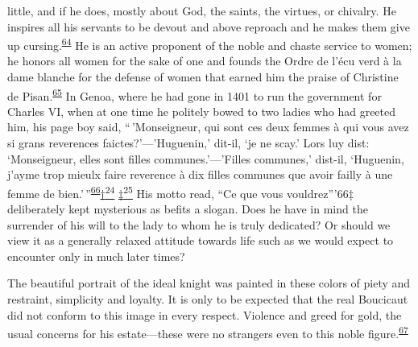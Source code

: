 little, and if he does, mostly about God, the saints, the virtues, or
chivalry. He inspires all his servants to be devout and above reproach
and he makes them give up
cursing.\textsuperscript{\protect\hypertarget{10_Chapter_Three__THE_HEROIC_DREAM.xhtmlux5cux23id_1805}{\protect\hyperlink{23_NOTES.xhtmlux5cux23id_1806}{64}}}
He is an active proponent of the noble and chaste service to women; he
honors all women for the sake of one and founds the Ordre de l'écu verd
à la dame blanche for the defense of women that earned him the praise of
Christine de
Pisan.\textsuperscript{\protect\hypertarget{10_Chapter_Three__THE_HEROIC_DREAM.xhtmlux5cux23id_1803}{\protect\hyperlink{23_NOTES.xhtmlux5cux23id_1804}{65}}}
In Genoa, where he had gone in 1401 to run the government for Charles
VI, when at one time he politely bowed to two ladies who had greeted
him, his page boy said, ``\,'Monseigneur, qui sont ces deux femmes à qui
vous avez si grans reverences faictes?'---'Huguenin,' dit-il, `je ne
scay.' Lors luy dist: `Monseigneur, elles sont filles
communes.'---'Filles communes,' dist-il, `Huguenin, j'ayme trop mieulx
faire reverence à dix filles communes que avoir failly à une femme de
bien.'\,''\textsuperscript{\protect\hypertarget{10_Chapter_Three__THE_HEROIC_DREAM.xhtmlux5cux23id_1802}{\protect\hyperlink{23_NOTES.xhtmlux5cux23page_407}{66}}}\protect\hypertarget{10_Chapter_Three__THE_HEROIC_DREAM.xhtmlux5cux23id_2509}{\protect\hyperlink{23_NOTES.xhtmlux5cux23id_2510}{†\textsuperscript{24}}}
\protect\hypertarget{10_Chapter_Three__THE_HEROIC_DREAM.xhtmlux5cux23id_2511}{\protect\hyperlink{23_NOTES.xhtmlux5cux23id_2512}{‡\textsuperscript{25}}}
His motto read, ``Ce que vous vouldrez''{}'66‡ deliberately kept
mysterious as befits a slogan. Does he have in mind the surrender of his
will to the lady to whom he is truly dedicated? Or should we view it as
a generally relaxed attitude towards life such as we would expect to
encounter only in much later times?

The beautiful portrait of the ideal knight was painted in these colors
of piety and restraint, simplicity and loyalty. It is only to be
expected that the real Boucicaut did not conform to this image in every
respect. Violence and greed for gold, the usual concerns for his
estate---these were no strangers even to this noble
figure.\textsuperscript{\protect\hypertarget{10_Chapter_Three__THE_HEROIC_DREAM.xhtmlux5cux23id_1800}{\protect\hyperlink{23_NOTES.xhtmlux5cux23id_1801}{67}}}

